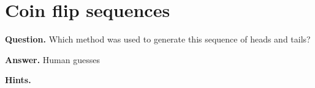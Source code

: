\documentclass{article}
\begin{document}
\section*{Coin flip sequences}
\textbf{Question.} Which method was used to generate this sequence of heads and tails?

\textbf{Answer.} Human guesses

\textbf{Hints.}
\begin{itemize}

\end{itemize}
\end{document}
